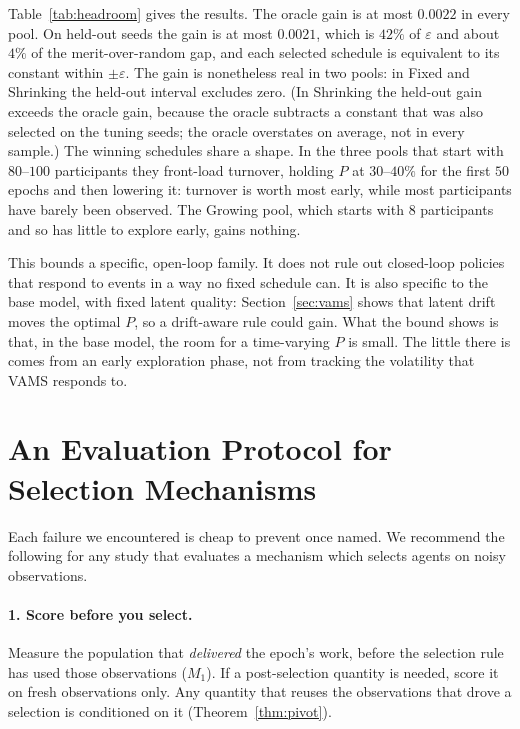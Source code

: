 \documentclass[sigconf,anonymous,review,nonacm]{acmart}
\begin{document}
Table~\ref{tab:headroom} gives the results. The oracle gain is at most $0.0022$ in every
pool. On held-out seeds the gain is at most $0.0021$, which is $42\%$ of $\varepsilon$ and
about $4\%$ of the merit-over-random gap, and each selected schedule is equivalent to its
constant within $\pm\varepsilon$. The gain is nonetheless real in two pools: in Fixed and Shrinking
the held-out interval excludes zero. (In Shrinking the held-out gain exceeds the oracle
gain, because the oracle subtracts a constant that was also selected on the tuning seeds;
the oracle overstates on average, not in every sample.) The winning
schedules share a shape. In the three pools that start with $80$--$100$ participants they
front-load turnover, holding $P$ at $30$--$40\%$ for the first $50$ epochs and then
lowering it: turnover is worth most early, while most participants have barely been
observed. The Growing pool, which starts with $8$ participants and so has little to
explore early, gains nothing.

This bounds a specific, open-loop family. It does not rule out closed-loop policies that
respond to events in a way no fixed schedule can. It is also specific to the base model,
with fixed latent quality: Section~\ref{sec:vams} shows that latent drift moves the optimal
$P$, so a drift-aware rule could gain. What the bound shows is that, in the base model,
the room for a time-varying $P$ is small. The little there is comes from an early
exploration phase, not from tracking the volatility that VAMS responds to.

\section{An Evaluation Protocol for Selection Mechanisms}
\label{sec:protocol}

Each failure we encountered is cheap to prevent once named. We recommend the following
for any study that evaluates a mechanism which selects agents on noisy observations.

\paragraph{1. Score before you select.} Measure the population that \emph{delivered} the
epoch's work, before the selection rule has used those observations ($M_1$). If a
post-selection quantity is needed, score it on fresh observations only. Any quantity that
reuses the observations that drove a selection is conditioned on it
(Theorem~\ref{thm:pivot}).
\end{document}
